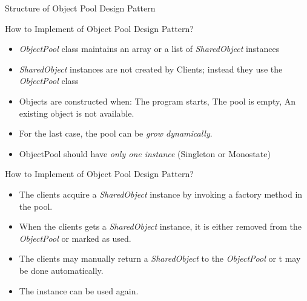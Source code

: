 \documentclass[13pt]{beamer}
\begin{document}
\begin{frame}{Structure of Object Pool Design Pattern}
	\begin{center}
	\end{center}
\end{frame}

\begin{frame}{How to Implement of Object Pool Design Pattern?}
	\begin{itemize}
		\setlength\itemsep{1em}
		\item \emph{ObjectPool} class maintains an array or a list of \emph{SharedObject} instances
		\item \emph{SharedObject} instances are not created by Clients; instead they use the \emph{ObjectPool} class
		\item Objects are constructed when: The program starts, The pool is empty, An existing object is not available.
		\item For the last case, the pool can be \emph{grow dynamically}.
		\item ObjectPool should have \emph{only one instance} (Singleton or Monostate)
	\end{itemize}
\end{frame}

\begin{frame}{How to Implement of Object Pool Design Pattern?}
	\begin{itemize}
		\setlength\itemsep{1em}
		\item The clients acquire a \emph{SharedObject} instance by invoking a factory method in the pool.
		\item When the clients gets a \emph{SharedObject} instance, it is either removed from the \emph{ObjectPool} or marked as used.
		\item The clients may manually return a \emph{SharedObject} to the \emph{ObjectPool} or t may be done automatically.
		\item The instance can be used again.
	\end{itemize}
\end{frame}
\end{document}
